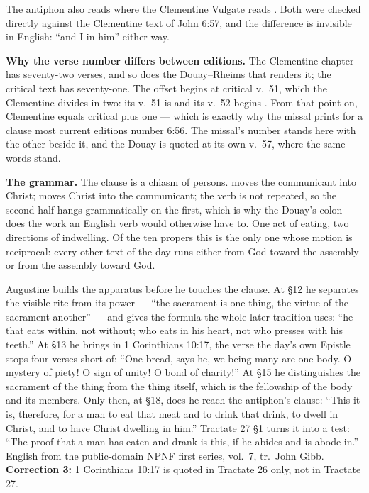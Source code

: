 The antiphon also reads  where the Clementine Vulgate
reads . Both were checked directly against the
Clementine text of John 6:57, and the difference is invisible in English:
``and I in him'' either way.

\textbf{Why the verse number differs between editions.} The Clementine chapter has seventy-two verses, and so does the
Douay--Rheims that renders it; the critical text has seventy-one. The offset
begins at critical v.~51, which the Clementine divides in two: its v.~51 is
 and its v.~52 begins
. From that point on, Clementine
equals critical plus one --- which is exactly why the missal prints  for a clause most current editions number 6:56. The missal's number
stands here with the other beside it, and the Douay is quoted at its own
v.~57, where the same words stand.

\textbf{The grammar.} The clause is a chiasm of persons. 
moves the communicant into Christ;  moves Christ into the
communicant; the verb is not repeated, so the second half hangs grammatically
on the first, which is why the Douay's colon does the work an English verb
would otherwise have to. One act of eating, two directions of indwelling. Of
the ten propers this is the only one whose motion is reciprocal: every other
text of the day runs either from God toward the assembly or from the assembly
toward God.

\begin{witnessnote}
Augustine builds the apparatus before he touches the clause. At §12 he
separates the visible rite from its power --- ``the sacrament is one thing, the
virtue of the sacrament another'' --- and gives the formula the whole later
tradition uses: ``he that eats within, not without; who eats in his heart, not
who presses with his teeth.'' At §13 he brings in 1 Corinthians 10:17, the
verse the day's own Epistle stops four verses short of: ``One bread, says he,
we being many are one body. O mystery of piety! O sign of unity! O bond of
charity!'' At §15 he distinguishes the sacrament of the thing from the thing
itself, which is the fellowship of the body and its members. Only then, at
§18, does he reach the antiphon's clause: ``This it is, therefore, for a man to
eat that meat and to drink that drink, to dwell in Christ, and to have Christ
dwelling in him.'' Tractate 27 §1 turns it into a test: ``The proof that a man
has eaten and drank is this, if he abides and is abode in.'' English from the
public-domain NPNF first series, vol.~7, tr.\ John Gibb. \textbf{Correction 3:}
1 Corinthians 10:17 is quoted in Tractate 26 only, not in Tractate 27.
\end{witnessnote}

